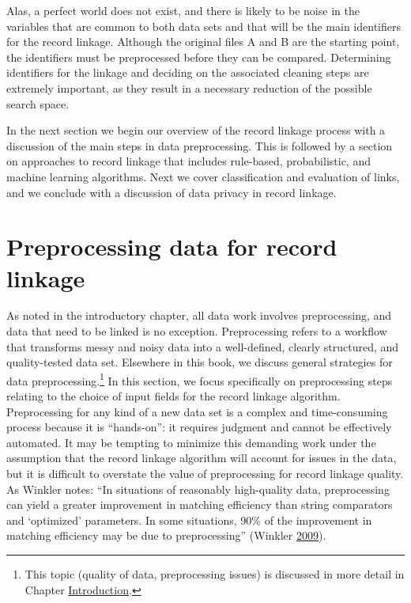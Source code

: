 \documentclass[]{krantz}
\begin{document}
Alas, a perfect world does not exist, and there is likely to be noise in
the variables that are common to both data sets and that will be the
main identifiers for the record linkage. Although the original files A
and B are the starting point, the identifiers must be preprocessed
before they can be compared. Determining identifiers for the linkage and
deciding on the associated cleaning steps are extremely important, as
they result in a necessary reduction of the possible search space.

In the next section we begin our overview of the record linkage process
with a discussion of the main steps in data preprocessing. This is
followed by a section on approaches to record linkage that includes
rule-based, probabilistic, and machine learning algorithms. Next we
cover classification and evaluation of links, and we conclude with a
discussion of data privacy in record linkage.

\section{Preprocessing data for record
linkage}\label{preprocessing-data-for-record-linkage}

As noted in the introductory chapter, all data work involves
preprocessing, and data that need to be linked is no exception.
Preprocessing refers to a workflow that transforms messy and noisy data
into a well-defined, clearly structured, and quality-tested data set.
Elsewhere in this book, we discuss general strategies for data
preprocessing.\footnote{This topic (quality of data, preprocessing
  issues) is discussed in more detail in Chapter
  \protect\hyperlink{chap:intro}{Introduction}.} In this section, we
focus specifically on preprocessing steps relating to the choice of
input fields for the record linkage algorithm. Preprocessing for any
kind of a new data set is a complex and time-consuming process because
it is ``hands-on'': it requires judgment and cannot be effectively
automated. It may be tempting to minimize this demanding work under the
assumption that the record linkage algorithm will account for issues in
the data, but it is difficult to overstate the value of preprocessing
for record linkage quality. As Winkler notes: ``In situations of
reasonably high-quality data, preprocessing can yield a greater
improvement in matching efficiency than string comparators and
`optimized' parameters. In some situations, 90\% of the improvement in
matching efficiency may be due to preprocessing'' (Winkler
\protect\hyperlink{ref-winkler09}{2009}).
\end{document}
